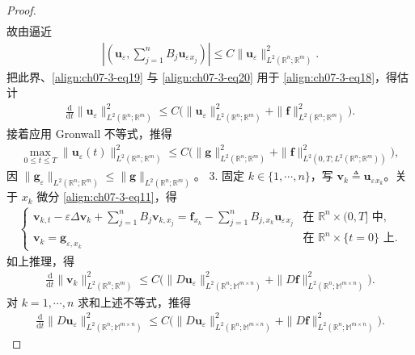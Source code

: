 \documentclass[../../main.tex]{subfiles}
\begin{document}
\begin{theorem}[能量估计]
\begin{proof}
\begin{align*}
\end{align*}
故由逼近
\begin{align*}
\left|\left(\mathbf{u}_\varepsilon,\sum_{j=1}^nB_j\mathbf{u}_\varepsilon{}_{x_j}\right)\right|\leqslant C\|\mathbf{u}_\varepsilon\|_{L^2(\mathbb{R}^n;\mathbb{R}^m)}^2.
\end{align*}
把此界、\eqref{align:ch07-3-eq19} 与 \eqref{align:ch07-3-eq20} 用于 \eqref{align:ch07-3-eq18}，得估计
\begin{align*}
\frac{\mathrm{d}}{\mathrm{d}t}\|\mathbf{u}_\varepsilon\|_{L^2(\mathbb{R}^n;\mathbb{R}^m)}^2\leqslant C\bigl(\|\mathbf{u}_\varepsilon\|_{L^2(\mathbb{R}^n;\mathbb{R}^m)}^2+\|\mathbf{f}\|_{L^2(\mathbb{R}^n;\mathbb{R}^m)}^2\bigr).
\end{align*}
接着应用 Gronwall 不等式，推得
\begin{align}
\max_{0\leqslant t\leqslant T}\|\mathbf{u}_\varepsilon(t)\|_{L^2(\mathbb{R}^n;\mathbb{R}^m)}^2\leqslant C\bigl(\|\mathbf{g}\|_{L^2(\mathbb{R}^n;\mathbb{R}^m)}^2+\|\mathbf{f}\|_{L^2(0,T;L^2(\mathbb{R}^n;\mathbb{R}^m))}^2\bigr),\label{align:ch07-3-eq21}
\end{align}
因 $\|\mathbf{g}_\varepsilon\|_{L^2(\mathbb{R}^n;\mathbb{R}^m)}\leqslant\|\mathbf{g}\|_{L^2(\mathbb{R}^n;\mathbb{R}^m)}$。
3. 固定 $k\in\{1,\cdots,n\}$，写 $\mathbf{v}_k\triangleq\mathbf{u}_\varepsilon{}_{x_k}$。关于 $x_k$ 微分 \eqref{align:ch07-3-eq11}，得
\begin{align*}
\begin{cases}
\mathbf{v}_{k,t}-\varepsilon\Delta\mathbf{v}_k+\sum_{j=1}^nB_j\mathbf{v}_{k,x_j}=\mathbf{f}_{x_k}-\sum_{j=1}^nB_{j,x_k}\mathbf{u}_\varepsilon{}_{x_j}&\text{在 }\mathbb{R}^n\times(0,T]\text{ 中},\\
\mathbf{v}_k=\mathbf{g}_{\varepsilon,x_k}&\text{在 }\mathbb{R}^n\times\{t=0\}\text{ 上}.
\end{cases}
\end{align*}
如上推理，得
\begin{align}
\frac{\mathrm{d}}{\mathrm{d}t}\|\mathbf{v}_k\|_{L^2(\mathbb{R}^n;\mathbb{R}^m)}^2\leqslant C\bigl(\|D\mathbf{u}_\varepsilon\|_{L^2(\mathbb{R}^n;\mathbb{M}^{m\times n})}^2+\|D\mathbf{f}\|_{L^2(\mathbb{R}^n;\mathbb{M}^{m\times n})}^2\bigr).\label{align:ch07-3-eq22}
\end{align}
对 $k=1,\cdots,n$ 求和上述不等式，推得
\begin{align*}
\frac{\mathrm{d}}{\mathrm{d}t}\|D\mathbf{u}_\varepsilon\|_{L^2(\mathbb{R}^n;\mathbb{M}^{m\times n})}^2\leqslant C\bigl(\|D\mathbf{u}_\varepsilon\|_{L^2(\mathbb{R}^n;\mathbb{M}^{m\times n})}^2+\|D\mathbf{f}\|_{L^2(\mathbb{R}^n;\mathbb{M}^{m\times n})}^2\bigr).

\end{align*}
\end{proof}
\end{theorem}
\end{document}
